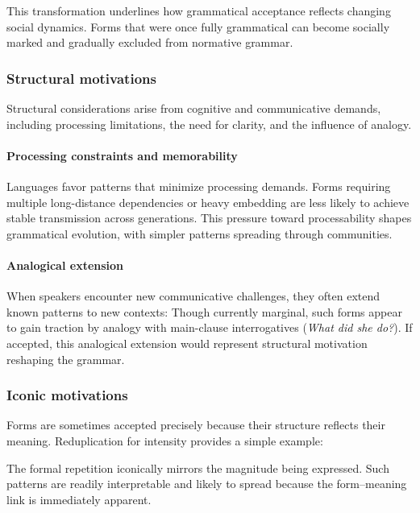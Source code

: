 \documentclass[12pt,letterpaper]{article}
\begin{document}
This transformation underlines how grammatical acceptance reflects changing social dynamics. Forms that were once fully grammatical can become socially marked and gradually excluded from normative grammar.

\subsubsection{Structural motivations}\label{subsec:structural-motivations}

Structural considerations arise from cognitive and communicative demands, including processing limitations, the need for clarity, and the influence of analogy.

\paragraph{Processing constraints and memorability}
Languages favor patterns that minimize processing demands. Forms requiring multiple long-distance dependencies or heavy embedding are less likely to achieve stable transmission across generations. This pressure toward processability shapes grammatical evolution, with simpler patterns spreading through communities.

\paragraph{Analogical extension}
When speakers encounter new communicative challenges, they often extend known patterns to new contexts:
\z
Though currently marginal, such forms appear to gain traction by analogy with main-clause interrogatives (\textit{What did she do?}). If accepted, this analogical extension would represent structural motivation reshaping the grammar.

\subsubsection{Iconic motivations}\label{subsec:iconic-motivations}

Forms are sometimes accepted precisely because their structure reflects their meaning. Reduplication for intensity provides a simple example:
\label{ex:big-big-change}
\z

The formal repetition iconically mirrors the magnitude being expressed. Such patterns are readily interpretable and likely to spread because the form--meaning link is immediately apparent.
\end{document}
